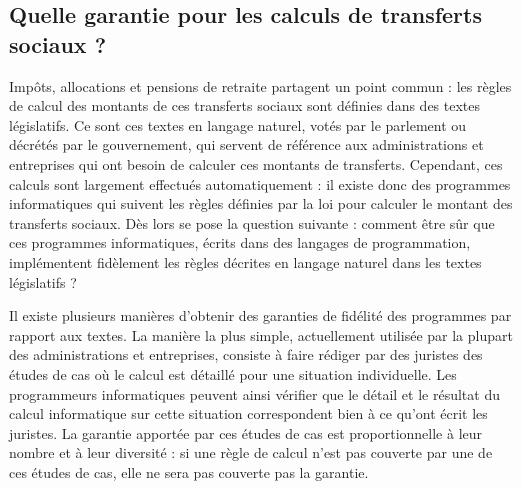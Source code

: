 
\subsection{Quelle garantie pour les calculs de transferts sociaux ?}

Impôts, allocations et pensions de retraite partagent un point commun : les règles de calcul des montants de ces transferts sociaux sont définies dans des textes législatifs. Ce sont ces textes en langage naturel, votés par le parlement ou décrétés par le gouvernement, qui servent de référence aux administrations et entreprises qui ont besoin de calculer ces montants de transferts. Cependant, ces calculs sont largement effectués automatiquement : il existe donc des programmes informatiques qui suivent les règles définies par la loi pour calculer le montant des transferts sociaux. Dès lors se pose la question suivante : comment être sûr que ces programmes informatiques, écrits dans des langages de programmation, implémentent fidèlement les règles décrites en langage naturel dans les textes législatifs ?
%

Il existe plusieurs manières d'obtenir des garanties de fidélité des programmes par rapport aux textes. La manière la plus simple, actuellement utilisée par la plupart des administrations et entreprises, consiste à faire rédiger par des juristes des études de cas où le calcul est détaillé pour une situation individuelle. Les programmeurs informatiques peuvent ainsi vérifier que le détail et le résultat du calcul informatique sur cette situation correspondent bien à ce qu'ont écrit les juristes. La garantie apportée par ces études de cas est proportionnelle à leur nombre et à leur diversité : si une règle de calcul n'est pas couverte par une de ces études de cas, elle ne sera pas couverte pas la garantie.

